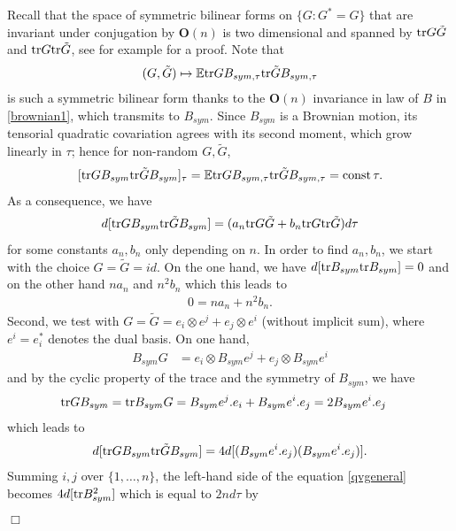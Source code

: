 \documentclass[english, letterpaper,12pt,reqno]{amsart}
\theoremstyle{remark}
\renewenvironment{proof}[1][Proof]{ {\itshape \noindent {#1.}} }{$\Box$
\medskip}
\theoremstyle{plain}
\newcommand{\1}{\mathbf{1}}
\def\bbE{\mathbb E}
\def\tr{{\rm tr}}
\begin{document}
\begin{proof}[Proof of Lemma~\ref{lem:quadraticvar}]
Recall that the space of symmetric bilinear forms on $\{G:G^*=G\}$ that are invariant under conjugation by $ \textbf{O}(n)$ is two dimensional and spanned by $\tr G \tilde G$ and $\tr G \tr \tilde G$, see for example \cite[Lemma 16]{MOW25} for a proof. Note that 
%
$$(G, \tilde G) \mapsto   \bbE \tr GB_{sym,\tau} \tr \tilde GB_{sym,\tau}$$
%
is such a symmetric bilinear form thanks to the $\textbf{O}(n)$ invariance in law of $B$ in \ref{brownian1}, which transmits to $B_{sym}$. Since $B_{sym}$ is a Brownian motion, its tensorial quadratic covariation agrees with its second moment, which grow linearly in $\tau$; hence for non-random $G,\tilde G$, 
%
$$[\tr GB_{sym} \tr \tilde GB_{sym}]_{\tau}=\bbE \tr GB_{sym,\tau} \tr \tilde GB_{sym,\tau}=\text{const}\, \tau.$$ 
%
As a consequence, we have
%
\begin{align}\label{qvgeneral}
       d[ \tr GB_{sym} \tr \tilde GB_{sym}] =(a_{n} \tr G \tilde G+b_{n} \tr G \tr\tilde G ) d\tau
    \end{align}
for some constants $a_n,b_n$ only depending on $n$. 
%
\noindent
In order to find $a_n,b_n$, we start with the choice $G=\tilde G=id$. On the one hand, we have $d[\tr B_{sym}\tr B_{sym}  ]=0$ and on the other hand $n a_{n}$ and $n^2 b_n$ which this leads to 
%
\begin{align}
      0=n a_n+n^2 b_n.\label{system1}
    \end{align}
%
Second, we test with $G=\tilde G=e_i\otimes e^j +e_j\otimes e^i$ (without implicit sum), where $e^i=e_i^*$ denotes the dual basis. On one hand, 
%
\begin{align}\label{BG}
    B_{sym}G&=e_i \otimes B_{sym}e^j+e_j \otimes B_{sym}e^i 
    \end{align}
%
and by the cyclic property of the trace and the symmetry of $B_{sym}$, we have
%
     \begin{align*}
  \tr GB_{sym}&=  \tr B_{sym}G   =B_{sym}e^j.  e_i+B_{sym}e^i. e_j=2 B_{sym} e^i. e_j 
\end{align*}
%
which leads to
%
\begin{align*}
        d[\tr GB_{sym}\tr \tilde G B_{sym}]=4d[(B_{sym}e^i. e_j) (B_{sym}e^i. e_j)]. 
    \end{align*}
   Summing $i,j$ over $\{1,\dots,n\}$, the left-hand side of the equation \eqref{qvgeneral} becomes $4d[\tr B_{sym}^2 ]$ which is equal to $2n d\tau$ by 
   \begin{align}\label{qvtrb2}

\end{align}
\end{proof}
\end{document}
